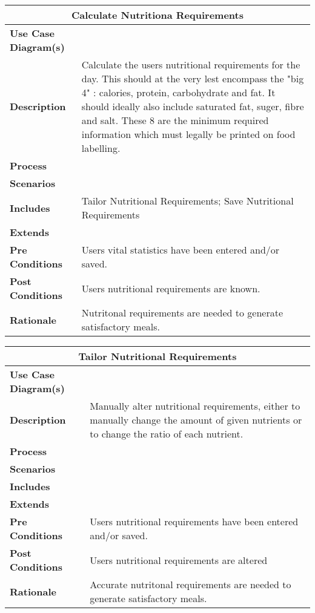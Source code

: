 \documentclass[12pt]{article}
\begin{document}
\begin{center}
\begin{tabularx}{\textwidth}{ |X|X|}
\hline
\multicolumn{2}{|c|}{\textbf{Calculate Nutritiona Requirements}}\\
\hline
\hline
\textbf{Use Case Diagram(s)} & \\ \hline
\textbf{Description} & Calculate the users nutritional requirements for the day. This should at the very lest encompass the "big 4" : calories, protein, carbohydrate and fat. It should ideally also include saturated fat, suger, fibre and salt. These 8 are the minimum required information which must legally be printed on food labelling.\\ \hline
\textbf{Process} & \\ \hline
\textbf{Scenarios} & \\ \hline
\textbf{Includes} & Tailor Nutritional Requirements; Save Nutritional Requirements \\ \hline
\textbf{Extends} &  \\ \hline
\textbf{Pre Conditions} & Users vital statistics have been entered and/or saved.\\ \hline
\textbf{Post Conditions} & Users nutritional requirements are known.\\ \hline
\textbf{Rationale} & Nutritonal requirements are needed to generate satisfactory meals.\\ \hline
\end{tabularx}
\end{center}

\begin{center}
\begin{tabularx}{\textwidth}{ |X|X|}
\hline
\multicolumn{2}{|c|}{\textbf{Tailor Nutritional Requirements}}\\
\hline
\hline
\textbf{Use Case Diagram(s)} & \\ \hline
\textbf{Description} & Manually alter nutritional requirements, either to manually change the amount of given nutrients or to change the ratio of each nutrient.\\ \hline
\textbf{Process} & \\ \hline
\textbf{Scenarios} & \\ \hline
\textbf{Includes} & \\ \hline
\textbf{Extends} &  \\ \hline
\textbf{Pre Conditions} & Users  nutritional requirements have been entered and/or saved.\\ \hline
\textbf{Post Conditions} & Users nutritional requirements are altered\\ \hline
\textbf{Rationale} & Accurate nutritonal requirements are needed to generate satisfactory meals.\\ \hline
\end{tabularx}
\end{center}
\end{document}
